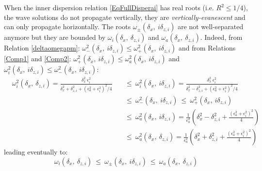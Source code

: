 \documentclass[a4paper,11pt]{article}
\begin{document}
When the inner dispersion relation \ref{EqFullDisperai} has real roots (i.e. $R^2\leq1/4$), the wave solutions do not propagate vertically, they are \textit{vertically-evanescent} and can only propagate horizontally. The roots $\omega_{\pm}(\delta_x,\ i\delta_{z,i})$ are not well-separated anymore but they are bounded by $\omega_{i}(\delta_x,\ \delta_{z,i})$ and $\omega_{a}(\delta_x,\ \delta_{z,i})$. Indeed,  from Relation \ref{deltaomegapm}: $\omega_{-}^2(\delta_x,\ i\delta_{z,i})\leq\omega_{+}^2(\delta_x,\ i\delta_{z,i})$ and from Relations \ref{Comp1} and \ref{Comp2}: $\omega_+^2(\delta_x,\ i\delta_{z,i})\leq\omega_a^2(\delta_x,\ i\delta_{z,i})$ and $\omega_i^2(\delta_x,\ i\delta_{z,i})\leq\omega_-^2(\delta_x,\ i\delta_{z,i})$:
\begin{subequations}
	\begin{alignat}{2}	
	\nonumber&\omega_{i}^2(\delta_x,\ \delta_{z,i})=
	\frac{\delta_x^2\ \epsilon_i^2}{\delta_x^2+\delta_{z,i}^2
	+(\epsilon_a^2+\epsilon_i^2)^2/4}
	&&\ \leq\  
	\omega_{i}^2(\delta_x,\ i\delta_{z,i})=
	\frac{\delta_x^2\ \epsilon_i^2}{\delta_x^2-\delta_{z,i}^2
	+(\epsilon_a^2+\epsilon_i^2)^2/4}\\[3mm]
	\nonumber& &&\ \leq\ \omega_-^2(\delta_x,\ i\delta_{z,i})\ \leq\ \omega_+^2(\delta_x,\ i\delta_{z,i})\\[3mm]
	\nonumber& &&\ \leq\  
	\omega_{a}^2(\delta_x,\ i\delta_{z,i})=\frac{1}{\epsilon_a^2}\left(
	\delta_x^2-\delta_{z,i}^2
	+\frac{(\epsilon_a^2+\epsilon_i^2)^2}{4}
	\right)\\[3mm]
	\nonumber& &&\ \leq\ 
	\omega_{a}^2(\delta_x,\ \delta_{z,i})=\frac{1}{\epsilon_a^2}\left(
	\delta_x^2+\delta_{z,i}^2
	+\frac{(\epsilon_a^2+\epsilon_i^2)^2}{4}
	\right)
	\end{alignat}
\end{subequations}
leading eventually to:
\begin{equation}
	\omega_{i}(\delta_x,\ \delta_{z,i})
	\ \leq\  
	\omega_{\pm}(\delta_x,\ i\delta_{z,i})
	\ \leq\ 
	\omega_{a}(\delta_x,\ \delta_{z,i})
	\label{RelInequal}
\end{equation}
\end{document}
